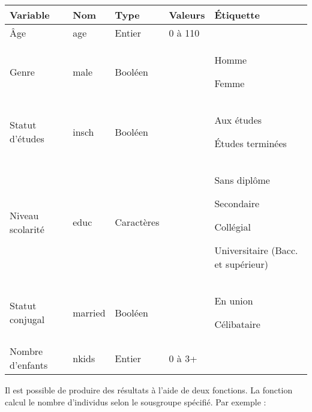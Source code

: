\documentclass[letterpaper,10pt,french]{sphinxmanual}
\begin{document}
\begin{savenotes}\sphinxattablestart
\centering
\begin{tabulary}{\linewidth}[t]{|T|T|T|T|T|}
\hline
\sphinxstyletheadfamily 
Variable
&\sphinxstyletheadfamily 
Nom
&\sphinxstyletheadfamily 
Type
&\sphinxstyletheadfamily 
Valeurs
&\sphinxstyletheadfamily 
Étiquette
\\
\hline
Âge
&
age
&
Entier
&
0 à 110
&\\
\hline
Genre
&
male
&
Booléen
&

&
Homme

Femme
\\
\hline
Statut d’études
&
insch
&
Booléen
&

&
Aux études

Études terminées
\\
\hline
Niveau scolarité
&
educ
&
Caractères
&



&
Sans diplôme

Secondaire

Collégial

Universitaire (Bacc. et supérieur)
\\
\hline
Statut conjugal
&
married
&
Booléen
&

&
En union

Célibataire
\\
\hline
Nombre d’enfants
&
nkids
&
Entier
&
0 à 3+
&\\
\hline
\end{tabulary}
\par
\sphinxattableend\end{savenotes}


Il est possible de produire des résultats à l’aide de deux fonctions.
La fonction  calcul le nombre d’individus selon le sous\sphinxhyphen{}groupe spécifié. Par exemple :

\begin{sphinxVerbatim}[commandchars=\\\{\}]
\end{sphinxVerbatim}
\end{document}
